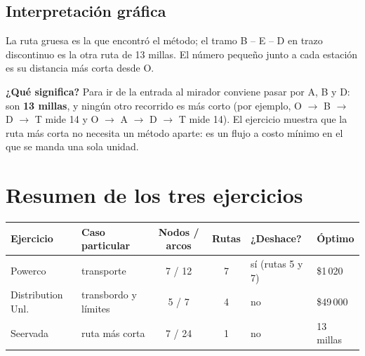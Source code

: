 \documentclass[11pt,a4paper]{article}
\newcommand{\ra}{\ensuremath{\to}}
\begin{document}
\subsection*{Interpretación gráfica}
\noindent
\begin{minipage}[c]{0.56\textwidth}\centering
{}
\end{minipage}\hfill
\begin{minipage}[c]{0.42\textwidth}
La ruta gruesa es la que encontró el método; el tramo B -- E -- D en trazo discontinuo es la otra ruta de 13 millas.
El número pequeño junto a cada estación es su distancia más corta desde O.
\end{minipage}

\textbf{¿Qué significa?} Para ir de la entrada al mirador conviene pasar por A, B y D: son \textbf{13 millas}, y
ningún otro recorrido es más corto (por ejemplo, O \ra{} B \ra{} D \ra{} T mide 14 y O \ra{} A \ra{} D \ra{} T mide 14).
El ejercicio muestra que la ruta más corta no necesita un método aparte: es un flujo a costo mínimo en el que se manda
una sola unidad.

\section*{Resumen de los tres ejercicios}
\begin{center}\small
\begin{tabular}{llccll}
\toprule
\textbf{Ejercicio} & \textbf{Caso particular} & \textbf{Nodos / arcos} & \textbf{Rutas} & \textbf{¿Deshace?} & \textbf{Óptimo} \\
\midrule
Powerco & transporte & 7 / 12 & 7 & sí (rutas 5 y 7) & \$1\,020 \\
Distribution Unl. & transbordo y límites & 5 / 7 & 4 & no & \$49\,000 \\
Seervada & ruta más corta & 7 / 24 & 1 & no & 13 millas \\
\bottomrule
\end{tabular}
\end{center}
\end{document}
